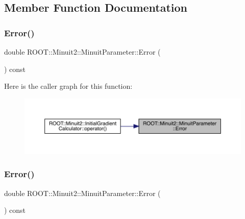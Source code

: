 \subsection{Member Function Documentation}
\mbox{\label{classROOT_1_1Minuit2_1_1MinuitParameter_af92997a2e9a7209fbddd286bbd1dbc3d}} 
\subsubsection{\texorpdfstring{Error()}{Error()}\hspace{0.1cm}{\footnotesize\ttfamily [1/2]}}
{\footnotesize\ttfamily double R\+O\+O\+T\+::\+Minuit2\+::\+Minuit\+Parameter\+::\+Error (\begin{DoxyParamCaption}{ }\end{DoxyParamCaption}) const\hspace{0.3cm}{\ttfamily [inline]}}

Here is the caller graph for this function\+:\nopagebreak
\begin{figure}[H]
\begin{center}
\leavevmode
\includegraphics[width=350pt]{dd/dfb/classROOT_1_1Minuit2_1_1MinuitParameter_af92997a2e9a7209fbddd286bbd1dbc3d_icgraph}
\end{center}
\end{figure}
\mbox{\label{classROOT_1_1Minuit2_1_1MinuitParameter_af92997a2e9a7209fbddd286bbd1dbc3d}} 
\subsubsection{\texorpdfstring{Error()}{Error()}\hspace{0.1cm}{\footnotesize\ttfamily [2/2]}}
{\footnotesize\ttfamily double R\+O\+O\+T\+::\+Minuit2\+::\+Minuit\+Parameter\+::\+Error (\begin{DoxyParamCaption}{ }\end{DoxyParamCaption}) const\hspace{0.3cm}{\ttfamily [inline]}}

